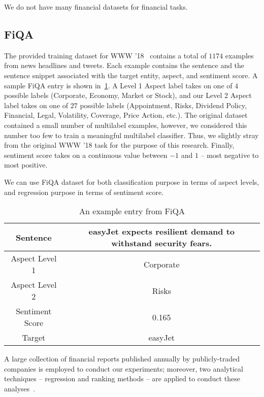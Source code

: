 \documentclass[11pt]{article}
\begin{document}
We do not have many financial datasets for financial tasks.


\subsection{FiQA}

The provided training dataset for WWW ’18~\cite{maia2018} contains a
total of $1174$ examples from news headlines and tweets. Each example
contains the sentence and the sentence snippet associated with the target entity, aspect, and sentiment score. A
sample FiQA entry is shown in~\ref{tab:fiqa_example}. A Level 1 Aspect
label takes on one of $4$ possible labels (Corporate, Economy, Market or Stock), and our Level 2 Aspect label takes on
one of $27$ possible labels (Appointment, Risks, Dividend Policy, Financial, Legal, Volatility, Coverage, Price Action, etc.). The original
dataset contained a small number of multilabel examples, however, we considered this number
too few to train a meaningful multilabel classifier. Thus, we slightly
stray from the original WWW ’18 task for the purpose of this research. Finally, sentiment score takes on a continuous value between $-1$ and $1$ – most negative to most positive.

We can use FiQA dataset for both classification purpose in terms of aspect levels, and regression purpose in terms of sentiment score.

\begin{table}
  \begin{tabular}{|c|c|}
    \hline 
 Sentence & easyJet expects resilient demand to withstand security
            fears. \\ \hline
Aspect Level 1 &  Corporate \\ \hline 
Aspect Level 2 & Risks \\ \hline 
Sentiment Score & 0.165 \\ \hline 
Target & easyJet \\ \hline 
\end{tabular}
\caption{An example entry from FiQA}
\label{tab:fiqa_example}
\end{table}

A large collection of financial reports published annually by publicly-traded companies is employed to conduct our experiments;
moreover, two analytical techniques – regression and ranking methods –
are applied to conduct these analyses~\cite{xxx}.
\end{document}
